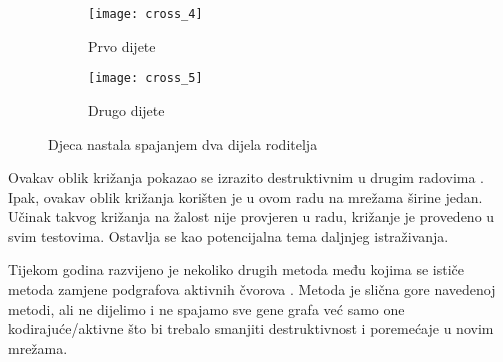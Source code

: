 \begin{figure}[h]
	\centering
	\begin{subfigure}{0.4\textwidth}
		\texttt{[image: cross\_4]} 
		\caption{Prvo dijete}
	\end{subfigure}
	\begin{subfigure}[b]{0.4\textwidth}
		{\texttt{[image: cross\_5]}}
		\caption{Drugo dijete}
	\end{subfigure}
	\caption{Djeca nastala spajanjem dva dijela roditelja}
\end{figure}
\newpage
\par
Ovakav oblik križanja pokazao se izrazito destruktivnim u drugim radovima \cite{CGPbook}. Ipak, ovakav oblik križanja korišten je u ovom radu na mrežama širine jedan. Učinak takvog križanja na žalost nije provjeren u radu, križanje je provedeno u svim testovima. Ostavlja se kao potencijalna tema daljnjeg istraživanja. 
\par
Tijekom godina razvijeno je nekoliko drugih metoda među kojima se ističe metoda zamjene podgrafova aktivnih čvorova \cite{newcross}. Metoda je slična gore navedenoj metodi, ali ne dijelimo i ne spajamo sve gene grafa već samo one kodirajuće/aktivne što bi trebalo smanjiti destruktivnost i poremećaje u novim mrežama. 
